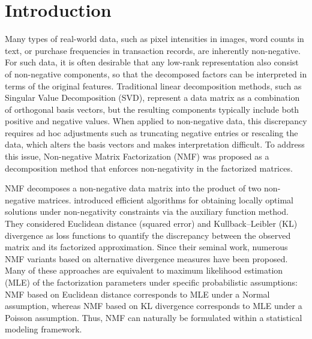 \documentclass[pdflatex,sn-basic]{sn-jnl}%
\theoremstyle{thmstyleone}%
\theoremstyle{thmstyletwo}%
\theoremstyle{thmstylethree}%
\begin{document}
\section{Introduction}\label{sec1}
Many types of real-world data, such as pixel intensities in images, word counts in text, or purchase frequencies in transaction records, are inherently non-negative.
For such data, it is often desirable that any low-rank representation also consist of non-negative components, so that the decomposed factors can be interpreted in terms of the original features.
Traditional linear decomposition methods, such as Singular Value Decomposition (SVD), represent a data matrix as a combination of orthogonal basis vectors, but the resulting components typically include both positive and negative values.
When applied to non-negative data, this discrepancy requires ad hoc adjustments such as truncating negative entries or rescaling the data, which alters the basis vectors and makes interpretation difficult.
To address this issue, Non-negative Matrix Factorization (NMF) was proposed as a decomposition method that enforces non-negativity in the factorized matrices.

NMF decomposes a non-negative data matrix into the product of two non-negative matrices.
\citet{Lee1999} introduced efficient algorithms for obtaining locally optimal solutions under non-negativity constraints via the auxiliary function method.
They considered Euclidean distance (squared error) and Kullback–Leibler (KL) divergence as loss functions to quantify the discrepancy between the observed matrix and its factorized approximation.
Since their seminal work, numerous NMF variants based on alternative divergence measures have been proposed.
Many of these approaches are equivalent to maximum likelihood estimation (MLE) of the factorization parameters under specific probabilistic assumptions: NMF based on Euclidean distance corresponds to MLE under a Normal assumption, whereas NMF based on KL divergence corresponds to MLE under a Poisson assumption.
Thus, NMF can naturally be formulated within a statistical modeling framework.
\end{document}
